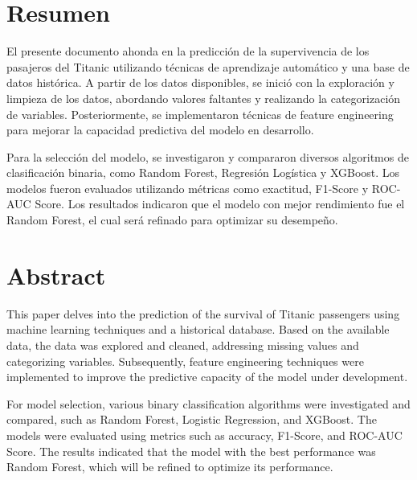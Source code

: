 \section*{Resumen}
El presente documento ahonda en la predicción de la supervivencia de los pasajeros del Titanic utilizando técnicas de aprendizaje automático y una base de datos histórica. A partir de los datos disponibles, se inició con la exploración y limpieza de los datos, abordando valores faltantes y realizando la categorización de variables. Posteriormente, se implementaron técnicas de feature engineering para mejorar la capacidad predictiva del modelo en desarrollo.

Para la selección del modelo, se investigaron y compararon diversos algoritmos de clasificación binaria, como Random Forest, Regresión Logística y XGBoost. Los modelos fueron evaluados utilizando métricas como exactitud, F1-Score y ROC-AUC Score. Los resultados indicaron que el modelo con mejor rendimiento fue el Random Forest, el cual será refinado para optimizar su desempeño.

\section*{Abstract}
This paper delves into the prediction of the survival of Titanic passengers using machine learning techniques and a historical database. Based on the available data, the data was explored and cleaned, addressing missing values and categorizing variables. Subsequently, feature engineering techniques were implemented to improve the predictive capacity of the model under development.

For model selection, various binary classification algorithms were investigated and compared, such as Random Forest, Logistic Regression, and XGBoost. The models were evaluated using metrics such as accuracy, F1-Score, and ROC-AUC Score. The results indicated that the model with the best performance was Random Forest, which will be refined to optimize its performance.

